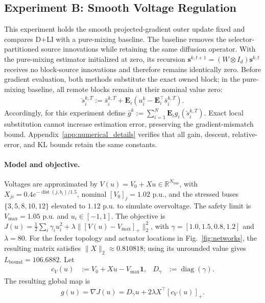 \documentclass[letterpaper, 10 pt, conference]{ieeeconf} %
\DeclareMathOperator{\dist}{dist}
\DeclareMathOperator{\diag}{diag}
\begin{document}
\subsection{Experiment B: Smooth Voltage Regulation}\label{subsec:exp_smooth}
This experiment holds the smooth projected-gradient outer update fixed and compares D+LI with a pure-mixing baseline. The baseline removes the selector-partitioned source innovations while retaining the same diffusion operator.
With the pure-mixing estimator initialized at zero, its recursion \(\mathbf s^{k,t+1}=(W\otimes I_d)\mathbf s^{k,t}\) receives no block-source innovations and therefore remains identically zero. 
Before gradient evaluation, both methods substitute the exact owned block; in the pure-mixing baseline, all remote blocks remain at their nominal value zero:
\begin{align}
\check s_i^{k,T}
:=
\bar s_i^{k,T}
+\mathbf E_i
\left(
u_i^k-\mathbf E_i^\top\bar s_i^{k,T}
\right).
\label{eq:exact_local_substitution}
\end{align}
Accordingly, for this experiment define \(\hat g^k:=\sum_{i=1}^N\mathbf E_i g_i(\check s_i^{k,T})\). Exact local substitution cannot increase estimation error, preserving the gradient-mismatch bound. Appendix~\ref{app:numerical_details} verifies that all gain,
descent, relative-error, and KL bounds retain the same constants.

\paragraph{Model and objective.}
Voltages are approximated by \(V(u)=V_0+Xu\in\mathbb R^{N_{\mathrm{bus}}}\), with \(X_{ji}=0.4e^{-\dist(j,b_i)/1.5}\), nominal \([V_0]_j=1.02\) p.u., and the stressed buses \(\{3,5,8,10,12\}\) elevated to \(1.12\) p.u. to simulate overvoltage. The safety limit is \(V_{\max}=1.05\) p.u. and \(u_i\in[-1,1]\). The objective is \(J(u)=\tfrac{1}{2}\sum_i \gamma_i u_i^2+\lambda\bigl\|[V(u)-V_{\max}]_+\bigr\|_2^2\), with \(\gamma=[1.0,1.5,0.8,1.2]\) and \(\lambda=80\). For the feeder topology and actuator locations in Fig.~\ref{fig:networks}, the resulting matrix satisfies \(\|X\|_2\approx0.810818\); using its unrounded value gives \(L_{\mathrm{bound}}=106.6882\).
Let
\begin{align}
c_V(u)&:=V_0+Xu-V_{\max}\mathbf1,
&
D_\gamma&:=\diag(\gamma).
\end{align}
The resulting global map is
\begin{align}
g(u)=\nabla J(u)
=
D_\gamma u+2\lambda X^\top[c_V(u)]_+.
\end{align}
\end{document}
